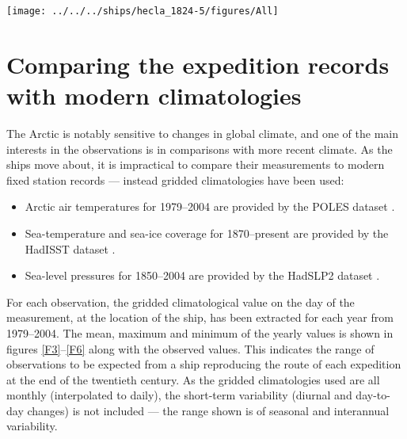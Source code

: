 \documentclass[CP]{copernicus}
\begin{document}
\begin{figure*}[!hbp]
\begin{center}
\texttt{[image: ../../../ships/hecla\_1824-5/figures/All]}
\caption{Weather observations from HMS {\it Hecla} and {\it Fury} in 1824--5, compared with modern values. The red and blue points are the expedition's observations (red from \citet{parry_1824}, and blue from \citet{fury_met_log_1824}), the black and grey lines are the mean, max and min values from modern datasets (monthly averages interpolated to daily, 1979-2004; SST and sea-ice from \citet{rayner03HadISST1}, AT from \citet{rigor97poles}, and pressure from \citet{allan06meansealevelpressure}). The grey band marks the period the expedition spent in winter harbour.}
\label{F6}
\end{center}
\end{figure*}

\section{Comparing the expedition records with modern climatologies}
\label{mcomp}

The Arctic is notably sensitive to changes in global climate, and one of the main interests in the observations is in comparisons with more recent climate. As the ships move about, it is impractical to compare their measurements to modern fixed station records --- instead gridded climatologies have been used:
\begin{itemize}
\item Arctic air temperatures for 1979--2004 are provided by the POLES dataset \citep{rigor97poles}.
\item Sea-temperature and sea-ice coverage for 1870--present are provided by the HadISST dataset \citep{rayner03HadISST1}.
\item Sea-level pressures for 1850--2004 are provided by the HadSLP2 dataset \citep{allan06meansealevelpressure}.
\end{itemize}
For each observation, the gridded climatological value on the day of the measurement, at the location of the ship, has been extracted for each year from 1979--2004. The mean, maximum and minimum of the yearly values is shown in figures \ref{F3}--\ref{F6} along with the observed values. This indicates the range of observations to be expected from a ship reproducing the route of each expedition at the end of the twentieth century. As the gridded climatologies used are all monthly (interpolated to daily), the short-term variability (diurnal and day-to-day changes) is not included --- the range shown is of seasonal and interannual variability.
\end{document}
